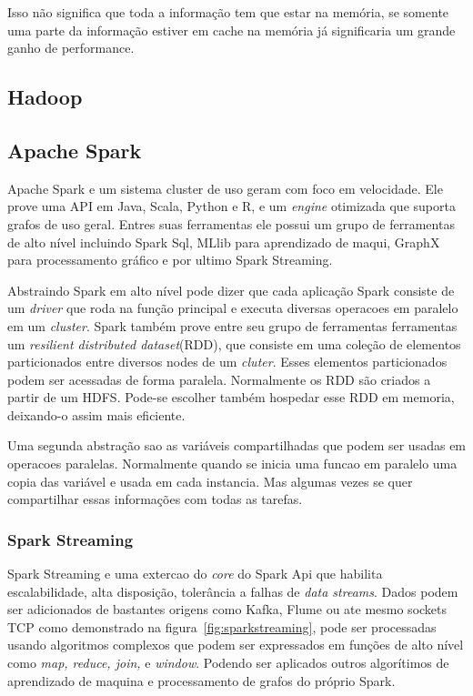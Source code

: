 Isso não significa que toda a informação tem que estar na memória, se somente uma parte da informação estiver em cache na memória já significaria um grande ganho de performance.~\cite{realtime}

\subsection{Hadoop}

\subsection{Apache Spark}
Apache Spark e um sistema cluster de uso geram com foco em velocidade. Ele prove uma API em Java, Scala, Python e R, e um \textit{engine} otimizada que suporta grafos de uso geral. Entres suas ferramentas ele possui um grupo de ferramentas de alto nível incluindo Spark Sql, MLlib para aprendizado de maqui, GraphX para processamento gráfico e por ultimo Spark Streaming.

Abstraindo Spark em alto nível pode dizer que cada aplicação Spark consiste de um \textit{driver} que roda na função principal e executa diversas operacoes em paralelo em um \textit{cluster}. Spark também prove entre seu grupo de ferramentas ferramentas um \textit{resilient distributed dataset}(RDD), que consiste em uma coleção de elementos particionados entre diversos nodes de um \textit{cluter}. Esses elementos particionados podem ser acessadas de forma paralela. Normalmente os RDD são criados a partir de um HDFS. Pode-se escolher também hospedar esse RDD em memoria, deixando-o assim mais eficiente.

Uma segunda abstração sao as variáveis compartilhadas que podem ser usadas em operacoes paralelas. Normalmente quando se inicia uma funcao em paralelo uma copia das variável e usada em cada instancia. Mas algumas vezes se quer compartilhar essas informações com todas as tarefas.

\subsubsection{Spark Streaming}
Spark Streaming e uma extercao do \textit{core} do Spark Api que habilita escalabilidade, alta disposição, tolerância a falhas de \textit{data streams}. Dados podem ser adicionados de bastantes origens  como Kafka, Flume ou ate mesmo sockets TCP como demonstrado na figura~\ref{fig:sparkstreaming}, pode ser processadas usando algoritmos complexos que podem ser expressados em funções de alto nível como \textit{map, reduce, join,} e \textit{window}. Podendo ser aplicados outros algorítimos de aprendizado de maquina e processamento de grafos do próprio Spark.~\cite{sparkstreaming}

